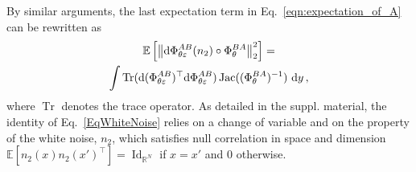 By similar arguments, the last expectation term in Eq.~\eqref{eqn:expectation_of_A} can be rewritten as
\begin{multline}\label{EqWhiteNoise}
  \mathbb{E}\left[\left\|\mathrm{d}\fxvarphivarepsilon( n_2) \circ \fxpsi \right\|^2_2\right] = \\ %
   \int \operatorname{Tr}(\mathrm{d}(\fxvarphivarepsilon)^{\top} \mathrm{d}\fxvarphivarepsilon) \operatorname{Jac}((\fxpsi)^{-1})~\mathrm{d}y\,,
\end{multline}
where $\operatorname{Tr}$ denotes the trace operator. As detailed in the suppl. material, the identity of Eq.~\eqref{EqWhiteNoise} relies on a change of variable and on the property of the white noise, $n_2$, which satisfies null correlation in space and dimension $\mathbb{E}[n_2(x) n_2(x')^\top] = \operatorname{Id}_{\mathbb{R}^N}$ if $x=x'$ and $0$ otherwise.

